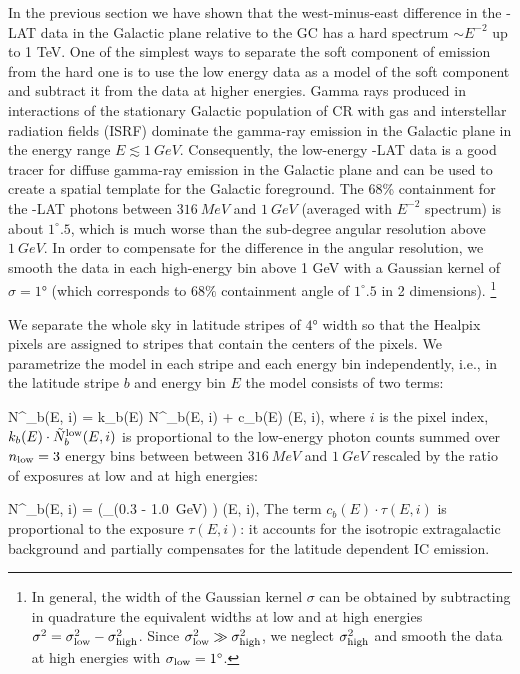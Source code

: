 In the previous section we have shown that the west-minus-east difference in the \Fermi-LAT data in the Galactic plane relative to the GC has a hard 
spectrum $\sim E^{-2}$ up to 1 TeV.
One of the simplest ways to separate the soft component of emission from the hard one is to use the low energy data as
a model of the soft component and subtract it from the data at higher energies.
Gamma rays produced in interactions of the stationary Galactic population of CR with gas and interstellar radiation fields (ISRF)
dominate the gamma-ray emission in the Galactic plane in the energy range $E \lesssim \SI{1}{GeV}$. 
Consequently, the low-energy \Fermi-LAT data is a good tracer for diffuse gamma-ray emission in the Galactic plane and can be used to create a spatial template for the Galactic foreground.
The 68\% containment for the \Fermi-LAT photons between $\SI{316}{MeV}$ and $\SI{1}{GeV}$ (averaged with $E^{-2}$ spectrum) is about $1^\circ\!\!.5$,
which is much worse than the sub-degree angular resolution above $\SI{1}{GeV}$.
In order to compensate for the difference in the angular resolution, 
we smooth the data in each high-energy bin above 1 GeV
with a Gaussian kernel of $\sigma = \ang{1}$ (which corresponds to $68\%$ containment angle of
$1^\circ\!\!.5$ in 2 dimensions).%
\footnote{In general, the width of the Gaussian kernel $\sigma$ can be obtained by subtracting in quadrature
the equivalent widths at low and at high energies $\sigma^2 = \sigma_{\rm low}^2 - \sigma_{\rm high}^2$.
Since $\sigma_{\rm low}^2 \gg \sigma_{\rm high}^2$, we neglect $\sigma_{\rm high}^2$ and smooth the 
data at high energies with $\sigma_{\rm low} = 1^\circ$.}

We separate the whole sky in latitude stripes of $\ang{4}$ width so that the Healpix pixels are assigned to stripes that contain the centers of the pixels.
We parametrize the model in each stripe and each energy bin independently, i.e., 
in the latitude stripe $b$ and energy bin $E$ the model consists of two terms:

\be
N^\model_{b}(E, i) = k_{b}(E) \cdot \tilde N^\low_{b}(E, i) + c_b(E) \cdot \tau(E, i),
\ee
where $i$ is the pixel index,
$k_{b}(E) \cdot \tilde N^{\text{low}}_b(E, i)$ is proportional to the low-energy photon counts summed over 
$n_{\text{low}} = 3$ energy bins between between $\SI{316}{MeV}$ and $\SI{1}{GeV}$ 
rescaled by the ratio of exposures at low and at high energies:

\be
\tilde N^\low_b(E, i) =  \left(\sum_{\epsilon \in (0.3 - \SI{1.0}{GeV})} \right) \cdot \tau(E, i),
\ee
The term $c_b(E) \cdot \tau(E, i)$ is proportional to the exposure $\tau(E, i)$: it accounts for the isotropic extragalactic background and partially compensates for the latitude dependent IC emission. 

